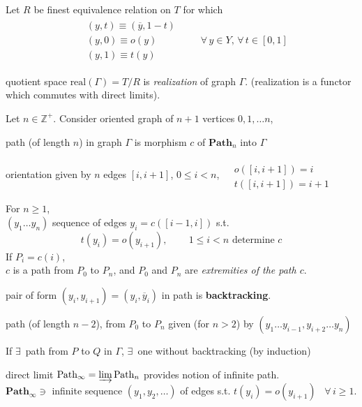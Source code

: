 Let $R$ be finest equivalence relation on $T$ for which 
\begin{equation}
\begin{gathered} \begin{aligned}
	& (y,t) \equiv (\overline{y}, 1-t) \\ 
	& (y,0) \equiv o(y) \\
	& (y,1) \equiv t(y)
\end{aligned} \qquad \, \forall \, y \in Y, \, \forall \, t \in [0,1]
\end{gathered}
\end{equation}

quotient space $\text{real}(\Gamma) = T/R $ is \emph{realization} of graph $\Gamma$.  (realization is a functor which commutes with direct limits).  

Let $n\in \mathbb{Z}^+$.  Consider oriented graph of $n+1$ vertices $0,1,\dots n$,  \\

\begin{definition}
	path (of length $n$) in graph $\Gamma$ is morphism $c$ of $\mathbf{\text{Path}}_n$ into $\Gamma$  
\end{definition}

orientation given by $n$ edges $[i,i+1]$, $0\leq i <n$, $\begin{aligned} & \quad \\
& o([i,i+1]) = i \\
& t([i,i+1]) = i+1 \end{aligned}$  

For $n\geq 1$, \\
$(y_1\dots y_n)$ sequence of edges $y_i = c([i-1,i])$ s.t. 
\[
t(y_i) = o(y_{i+1}), \qquad \, 1 \leq i < n \text{ determine } c
\]
If $P_i = c(i)$,  \\
$c$ is a path from $P_0$ to $P_n$, and $P_0$ and $P_n$ are \emph{extremities of the path $c$}.  

pair of form $(y_i,y_{i+1})=(y_i, \overline{y}_i)$ in path is \textbf{backtracking}.  

path (of length $n-2$), from $P_0$ to $P_n$ given (for $n>2$) by $(y_1\dots y_{i-1}, y_{i+2}\dots y_n)$  

If $\exists \, $ path from $P$ to $Q$ in $\Gamma$, $\exists \, $ one without backtracking (by induction)  

direct limit $\mathbf{\text{Path}}_{\infty} = \varinjlim \mathbf{\text{Path}}_n$ provides notion of infinite path.  \\
$\mathbf{\text{Path}}_{\infty} \ni $ infinite sequence $(y_1,y_2 , \dots)$ of edges s.t. $t(y_i) = o(y_{i+1})$ \, $\forall \, i \geq 1$.  


